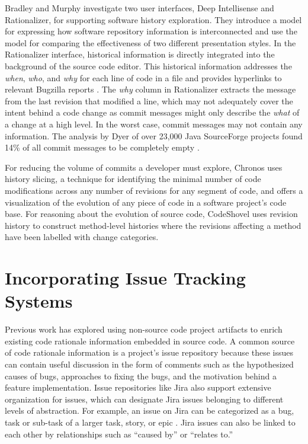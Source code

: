 Bradley and Murphy \cite{bradley_supporting_2011} investigate two user interfaces, Deep Intellisense and Rationalizer, 
for supporting software history exploration.
They introduce a model for expressing how software repository information is interconnected 
and use the model for comparing the effectiveness of two different presentation styles.
In the Rationalizer interface, historical information is directly integrated into the background of the source code editor.
This historical information addresses the \emph{when}, \emph{who}, and \emph{why} for each line of code in a file 
and provides hyperlinks to relevant Bugzilla reports \cite{bradley_supporting_2011}.
The \emph{why} column in Rationalizer extracts the message from the last revision that modified a line, 
which may not adequately cover the intent behind a code change as commit messages 
might only describe the \emph{what} of a change at a high level.
In the worst case, commit messages may not contain any information.
The analysis by Dyer \etal of over 23,000 Java SourceForge projects found 14\% of all 
commit messages to be completely empty \cite{dyer_boa_2013}.

For reducing the volume of commits a developer must explore, Chronos \cite{servant_history_2012} uses history slicing, 
a technique for identifying the minimal number of code modifications across any number of revisions for any segment of code, 
and offers a visualization of the evolution of any piece of code in a software project's code base.
For reasoning about the evolution of source code, CodeShovel \cite{grund_codeshovel_2021} 
uses revision history to construct method-level histories where the revisions affecting a 
method have been labelled with change categories.


\section{Incorporating Issue Tracking Systems}

Previous work has explored using non-source code project artifacts to enrich existing code 
rationale information embedded in source code. 
A common source of code rationale information is a project's issue repository because these 
issues can contain useful discussion in the form of comments such as the hypothesized causes of bugs, 
approaches to fixing the bugs, and the motivation behind a feature implementation. 
Issue repositories like Jira also support extensive organization for issues,
which can designate Jira issues belonging to different levels of abstraction.
For example, an issue on Jira can be categorized as a bug, task or sub-task of a larger task, story, or epic \cite{jira-issue-types}.
Jira issues can also be linked to each other by relationships such as ``caused by'' or ``relates to.''

